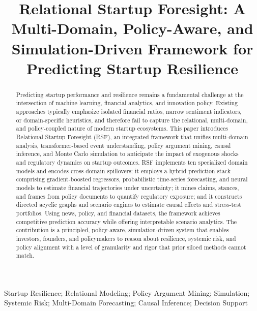 \documentclass[conference]{IEEEtran}
\begin{document}
\title{Relational Startup Foresight: A Multi-Domain, Policy-Aware, and Simulation-Driven Framework for Predicting Startup Resilience}

\author{
}

\maketitle

\begin{abstract}
Predicting startup performance and resilience remains a fundamental challenge at the intersection of machine learning, financial analytics, and innovation policy. Existing approaches typically emphasize isolated financial ratios, narrow sentiment indicators, or domain-specific heuristics, and therefore fail to capture the relational, multi-domain, and policy-coupled nature of modern startup ecosystems. This paper introduces Relational Startup Foresight (RSF), an integrated framework that unifies multi-domain analysis, transformer-based event understanding, policy argument mining, causal inference, and Monte Carlo simulation to anticipate the impact of exogenous shocks and regulatory dynamics on startup outcomes. RSF implements ten specialized domain models and encodes cross-domain spillovers; it employs a hybrid prediction stack comprising gradient-boosted regressors, probabilistic time-series forecasting, and neural models to estimate financial trajectories under uncertainty; it mines claims, stances, and frames from policy documents to quantify regulatory exposure; and it constructs directed acyclic graphs and scenario engines to estimate causal effects and stress-test portfolios. Using news, policy, and financial datasets, the framework achieves competitive prediction accuracy while offering interpretable scenario analytics. The contribution is a principled, policy-aware, simulation-driven system that enables investors, founders, and policymakers to reason about resilience, systemic risk, and policy alignment with a level of granularity and rigor that prior siloed methods cannot match.
\end{abstract}

\begin{IEEEkeywords}
Startup Resilience; Relational Modeling; Policy Argument Mining; Simulation; Systemic Risk; Multi-Domain Forecasting; Causal Inference; Decision Support
\end{IEEEkeywords}
\end{document}
